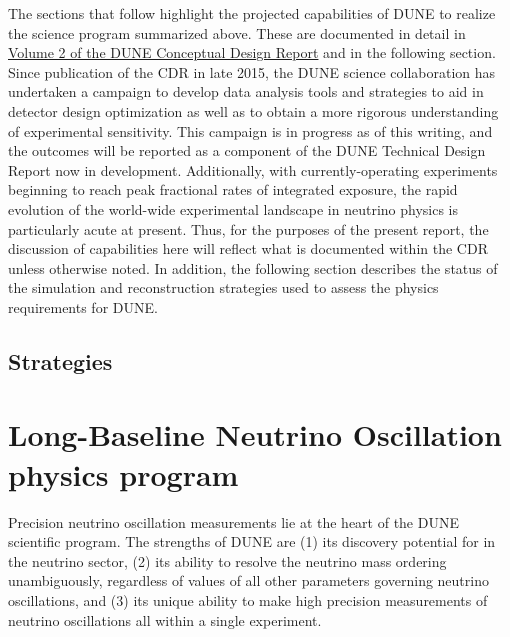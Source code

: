 The sections that follow highlight the projected capabilities of DUNE to realize the science program 
summarized above. These are documented in detail in \href{http://arxiv.org/abs/1512.06148}{Volume 2 
of the DUNE Conceptual Design Report} and in the following section.  Since publication of the CDR in late 2015, the DUNE science collaboration has undertaken a campaign to develop data analysis tools and strategies to aid 
in detector design optimization as well as to obtain a more rigorous understanding of experimental 
sensitivity.  This campaign is in progress as of this writing, and the outcomes will be reported 
as a component of the DUNE Technical Design Report now in development.  Additionally, with 
currently-operating experiments beginning to reach peak fractional rates of integrated exposure, 
the rapid evolution of the world-wide experimental landscape in neutrino physics is particularly acute 
at present.  Thus, for the purposes of the present report, the discussion of capabilities here 
will reflect what is documented within the CDR unless otherwise noted. In addition, the following section describes the status of the simulation and reconstruction strategies used to assess the physics requirements for DUNE.

\subsection{Strategies}
\label{sec:exec-summ-physics-ryan}


\section{Long-Baseline Neutrino Oscillation physics program}
\label{sec:exec-summ-physics-osc}

Precision neutrino oscillation measurements lie at the heart of the DUNE scientific program.  The strengths of DUNE are (1) its discovery potential for  in the neutrino sector, (2) its ability to resolve the neutrino mass ordering unambiguously, regardless of values of all other parameters governing neutrino oscillations, and (3) its unique ability to make high precision measurements of neutrino oscillations all within a single experiment.

